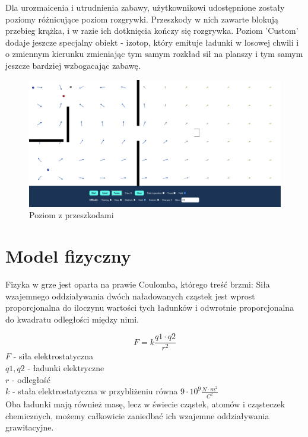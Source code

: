 \documentclass{article}
\begin{document}
Dla urozmaicenia i utrudnienia zabawy, użytkownikowi udostępnione zostały poziomy różnicujące poziom rozgrywki. Przeszkody w nich zawarte blokują przebieg krążka, i w razie ich dotknięcia kończy się rozgrywka. Poziom 'Custom' dodaje jeszcze specjalny obiekt - izotop, który emituje ładunki w losowej chwili i o zmiennym kierunku zmieniając tym samym rozkład sił na planszy i tym samym jeszcze bardziej wzbogacając zabawę. 

\begin{figure}[H]
    \centering
    \includegraphics[width=\textwidth,height=\textheight,keepaspectratio]{img/level.png}
    \caption{Poziom z przeszkodami}
    \label{fig:vector_drawing}
\end{figure}


\section{Model fizyczny}
Fizyka w grze jest oparta na prawie Coulomba, którego treść brzmi: Siła wzajemnego oddziaływania dwóch naładowanych cząstek jest wprost proporcjonalna do iloczynu wartości tych ładunków i odwrotnie proporcjonalna do kwadratu odległości między nimi.


$$F=k \frac{q 1 \cdot q 2}{r^{2}}$$
$F$ - siła elektrostatyczna \\
$q1, q2$ - ładunki elektryczne \\
$r$ - odległość \\
$k$ - stała elektrostatyczna w przybliżeniu równa $9 \cdot 10^9 \frac{N \cdot m^2}{C^2}$
\\

\noindent Oba ładunki mają również masę, lecz w świecie cząstek, atomów i cząsteczek chemicznych, możemy całkowicie zaniedbać ich wzajemne oddziaływania grawitacyjne.
\end{document}
